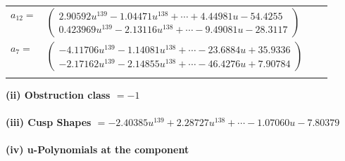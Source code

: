 \documentclass[1p]{elsarticle_modified}
\theoremstyle{definition}
\begin{document}
\begin{tabular}{m{7pt} m{180pt} m{7pt} m{180pt} }
\flushright $a_{12}=$&$\begin{pmatrix}2.90592 u^{139}-1.04471 u^{138}+\cdots+4.44981 u-54.4255\\0.423969 u^{139}-2.13116 u^{138}+\cdots-9.49081 u-28.3117\end{pmatrix}$ \\
\flushright $a_{7}=$&$\begin{pmatrix}-4.11706 u^{139}-1.14081 u^{138}+\cdots-23.6884 u+35.9336\\-2.17162 u^{139}-2.14855 u^{138}+\cdots-46.4276 u+7.90784\end{pmatrix}$\\&\end{tabular}
\flushleft \textbf{(ii) Obstruction class $= -1$}\\~\\
\flushleft \textbf{(iii) Cusp Shapes $= -2.40385 u^{139}+2.28727 u^{138}+\cdots-1.07060 u-7.80379$}\\~\\
\newpage\renewcommand{\arraystretch}{1}
\flushleft \textbf{(iv) u-Polynomials at the component}\newline \\
\end{document}
